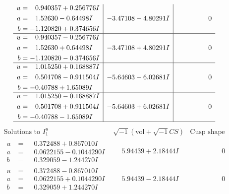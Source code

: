 \documentclass[1p]{elsarticle_modified}
\theoremstyle{definition}
\newcommand{\I}{\sqrt{-1}}
\begin{document}
$$\begin{array}{c|c|c}
\begin{aligned}
u &= \phantom{-}0.940357 + 0.256776 I \\
a &= \phantom{-}1.52630 - 0.64498 I \\
b &= -1.120820 + 0.374656 I\end{aligned}
 & -3.47108 - 4.80291 I & \phantom{-0.000000 } 0 \\ \hline\begin{aligned}
u &= \phantom{-}0.940357 - 0.256776 I \\
a &= \phantom{-}1.52630 + 0.64498 I \\
b &= -1.120820 - 0.374656 I\end{aligned}
 & -3.47108 + 4.80291 I & \phantom{-0.000000 } 0 \\ \hline\begin{aligned}
u &= \phantom{-}1.015250 + 0.168887 I \\
a &= \phantom{-}0.501708 - 0.911504 I \\
b &= -0.40788 + 1.65089 I\end{aligned}
 & -5.64603 - 6.02681 I & \phantom{-0.000000 } 0 \\ \hline\begin{aligned}
u &= \phantom{-}1.015250 - 0.168887 I \\
a &= \phantom{-}0.501708 + 0.911504 I \\
b &= -0.40788 - 1.65089 I\end{aligned}
 & -5.64603 + 6.02681 I & \phantom{-0.000000 } 0\\
 \hline 
 \end{array}$$\newpage$$\begin{array}{c|c|c}  
\text{Solutions to }I^u_{1}& \I (\text{vol} + \sqrt{-1}CS) & \text{Cusp shape}\\
 \hline 
\begin{aligned}
u &= \phantom{-}0.372488 + 0.867010 I \\
a &= \phantom{-}0.0622155 - 0.1044290 I \\
b &= \phantom{-}0.329059 - 1.244270 I\end{aligned}
 & \phantom{-}5.94439 + 2.18444 I & \phantom{-0.000000 } 0 \\ \hline\begin{aligned}
u &= \phantom{-}0.372488 - 0.867010 I \\
a &= \phantom{-}0.0622155 + 0.1044290 I \\
b &= \phantom{-}0.329059 + 1.244270 I\end{aligned}
 & \phantom{-}5.94439 - 2.18444 I & \phantom{-0.000000 } 0 \\ \hline\begin{aligned}

\end{aligned}
\end{array}$$
\end{document}

